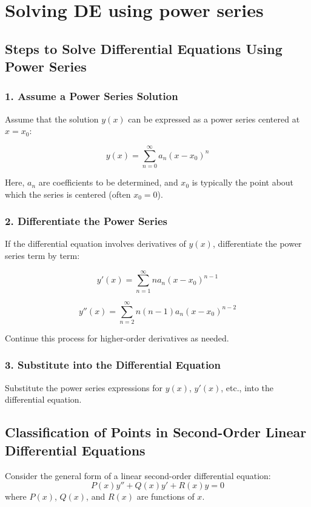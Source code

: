 \chapter{Solving DE using power series}

\section{Steps to Solve Differential Equations Using Power Series}

\subsection{1. Assume a Power Series Solution}
Assume that the solution $y(x)$ can be expressed as a power series centered at $x = x_0$:

\[y(x) = \sum_{n=0}^{\infty} a_n(x-x_0)^n\]

Here, $a_n$ are coefficients to be determined, and $x_0$ is typically the point about which the series is centered (often $x_0 = 0$).

\subsection{2. Differentiate the Power Series}
If the differential equation involves derivatives of $y(x)$, differentiate the power series term by term:

\[y'(x) = \sum_{n=1}^{\infty} na_n(x-x_0)^{n-1}\]

\[y''(x) = \sum_{n=2}^{\infty} n(n-1)a_n(x-x_0)^{n-2}\]

Continue this process for higher-order derivatives as needed.

\subsection{3. Substitute into the Differential Equation}
Substitute the power series expressions for $y(x)$, $y'(x)$, etc., into the differential equation.


\section{Classification of Points in Second-Order Linear Differential Equations}

Consider the general form of a linear second-order differential equation:
\[P(x)y'' + Q(x)y' + R(x)y = 0\]
where $P(x)$, $Q(x)$, and $R(x)$ are functions of $x$.

